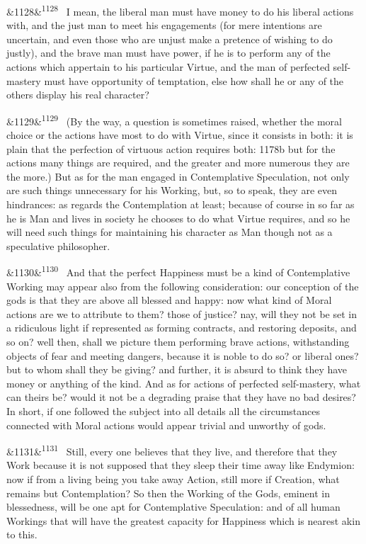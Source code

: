 \documentclass[12pt]{article}
\newcommand{\para}[1][]{\par\noindent\ifx&#1&\else\textsuperscript{\footnotesize #1}~\fi}
\begin{document}
\para[1128] I mean, the liberal man must have money to do his liberal actions with, and the just man to meet his engagements (for mere intentions are uncertain, and even those who are unjust make a pretence of wishing to do justly), and the brave man must have power, if he is to perform any of the actions which appertain to his particular Virtue, and the man of perfected self-mastery must have opportunity of temptation, else how shall he or any of the others display his real character?

\para[1129] (By the way, a question is sometimes raised, whether the moral choice or the actions have most to do with Virtue, since it consists in both: it is plain that the perfection of virtuous action requires both: 1178b but for the actions many things are required, and the greater and more numerous they are the more.) But as for the man engaged in Contemplative Speculation, not only are such things unnecessary for his Working, but, so to speak, they are even hindrances: as regards the Contemplation at least; because of course in so far as he is Man and lives in society he chooses to do what Virtue requires, and so he will need such things for maintaining his character as Man though not as a speculative philosopher.

\para[1130] And that the perfect Happiness must be a kind of Contemplative Working may appear also from the following consideration: our conception of the gods is that they are above all blessed and happy: now what kind of Moral actions are we to attribute to them? those of justice? nay, will they not be set in a ridiculous light if represented as forming contracts, and restoring deposits, and so on? well then, shall we picture them performing brave actions, withstanding objects of fear and meeting dangers, because it is noble to do so? or liberal ones? but to whom shall they be giving? and further, it is absurd to think they have money or anything of the kind. And as for actions of perfected self-mastery, what can theirs be? would it not be a degrading praise that they have no bad desires? In short, if one followed the subject into all details all the circumstances connected with Moral actions would appear trivial and unworthy of gods.

\para[1131] Still, every one believes that they live, and therefore that they Work because it is not supposed that they sleep their time away like Endymion: now if from a living being you take away Action, still more if Creation, what remains but Contemplation? So then the Working of the Gods, eminent in blessedness, will be one apt for Contemplative Speculation: and of all human Workings that will have the greatest capacity for Happiness which is nearest akin to this.
\end{document}
